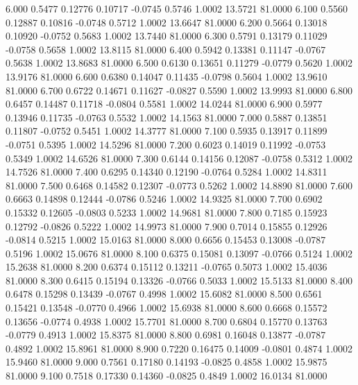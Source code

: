    6.000   0.5477   0.12776   0.10717  -0.0745   0.5746   1.0002  13.5721  81.0000
   6.100   0.5560   0.12887   0.10816  -0.0748   0.5712   1.0002  13.6647  81.0000
   6.200   0.5664   0.13018   0.10920  -0.0752   0.5683   1.0002  13.7440  81.0000
   6.300   0.5791   0.13179   0.11029  -0.0758   0.5658   1.0002  13.8115  81.0000
   6.400   0.5942   0.13381   0.11147  -0.0767   0.5638   1.0002  13.8683  81.0000
   6.500   0.6130   0.13651   0.11279  -0.0779   0.5620   1.0002  13.9176  81.0000
   6.600   0.6380   0.14047   0.11435  -0.0798   0.5604   1.0002  13.9610  81.0000
   6.700   0.6722   0.14671   0.11627  -0.0827   0.5590   1.0002  13.9993  81.0000
   6.800   0.6457   0.14487   0.11718  -0.0804   0.5581   1.0002  14.0244  81.0000
   6.900   0.5977   0.13946   0.11735  -0.0763   0.5532   1.0002  14.1563  81.0000
   7.000   0.5887   0.13851   0.11807  -0.0752   0.5451   1.0002  14.3777  81.0000
   7.100   0.5935   0.13917   0.11899  -0.0751   0.5395   1.0002  14.5296  81.0000
   7.200   0.6023   0.14019   0.11992  -0.0753   0.5349   1.0002  14.6526  81.0000
   7.300   0.6144   0.14156   0.12087  -0.0758   0.5312   1.0002  14.7526  81.0000
   7.400   0.6295   0.14340   0.12190  -0.0764   0.5284   1.0002  14.8311  81.0000
   7.500   0.6468   0.14582   0.12307  -0.0773   0.5262   1.0002  14.8890  81.0000
   7.600   0.6663   0.14898   0.12444  -0.0786   0.5246   1.0002  14.9325  81.0000
   7.700   0.6902   0.15332   0.12605  -0.0803   0.5233   1.0002  14.9681  81.0000
   7.800   0.7185   0.15923   0.12792  -0.0826   0.5222   1.0002  14.9973  81.0000
   7.900   0.7014   0.15855   0.12926  -0.0814   0.5215   1.0002  15.0163  81.0000
   8.000   0.6656   0.15453   0.13008  -0.0787   0.5196   1.0002  15.0676  81.0000
   8.100   0.6375   0.15081   0.13097  -0.0766   0.5124   1.0002  15.2638  81.0000
   8.200   0.6374   0.15112   0.13211  -0.0765   0.5073   1.0002  15.4036  81.0000
   8.300   0.6415   0.15194   0.13326  -0.0766   0.5033   1.0002  15.5133  81.0000
   8.400   0.6478   0.15298   0.13439  -0.0767   0.4998   1.0002  15.6082  81.0000
   8.500   0.6561   0.15421   0.13548  -0.0770   0.4966   1.0002  15.6938  81.0000
   8.600   0.6668   0.15572   0.13656  -0.0774   0.4938   1.0002  15.7701  81.0000
   8.700   0.6804   0.15770   0.13763  -0.0779   0.4913   1.0002  15.8375  81.0000
   8.800   0.6981   0.16048   0.13877  -0.0787   0.4892   1.0002  15.8961  81.0000
   8.900   0.7220   0.16475   0.14009  -0.0801   0.4874   1.0002  15.9460  81.0000
   9.000   0.7561   0.17180   0.14193  -0.0825   0.4858   1.0002  15.9875  81.0000
   9.100   0.7518   0.17330   0.14360  -0.0825   0.4849   1.0002  16.0134  81.0000

